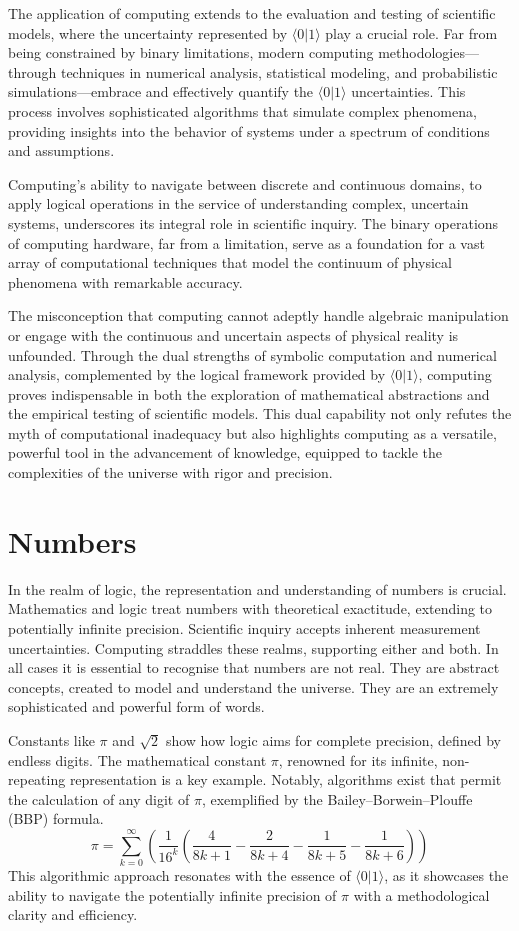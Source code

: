 \documentclass[12pt]{article}
\newcommand{\qbit}{\ensuremath{\langle 0 | 1 \rangle}}
\begin{document}
The application of computing extends to the evaluation and testing of scientific models, where the uncertainty represented by \(\qbit\) play a crucial role. Far from being constrained by binary limitations, modern computing methodologies—through techniques in numerical analysis, statistical modeling, and probabilistic simulations—embrace and effectively quantify the \(\qbit\) uncertainties. This process involves sophisticated algorithms that simulate complex phenomena, providing insights into the behavior of systems under a spectrum of conditions and assumptions.

Computing's ability to navigate between discrete and continuous domains, to apply logical operations in the service of understanding complex, uncertain systems, underscores its integral role in scientific inquiry. The binary operations of computing hardware, far from a limitation, serve as a foundation for a vast array of computational techniques that model the continuum of physical phenomena with remarkable accuracy.

The misconception that computing cannot adeptly handle algebraic manipulation or engage with the continuous and uncertain aspects of physical reality is unfounded. Through the dual strengths of symbolic computation and numerical analysis, complemented by the logical framework provided by \(\qbit\), computing proves indispensable in both the exploration of mathematical abstractions and the empirical testing of scientific models. This dual capability not only refutes the myth of computational inadequacy but also highlights computing as a versatile, powerful tool in the advancement of knowledge, equipped to tackle the complexities of the universe with rigor and precision.

\section*{Numbers}

In the realm of logic, the representation and understanding of numbers is crucial. Mathematics and logic treat numbers with theoretical exactitude, extending to potentially infinite precision. Scientific inquiry accepts inherent measurement uncertainties. Computing straddles these realms, supporting either and both. In all cases it is essential to recognise that numbers are not real. They are abstract concepts, created to model and understand the universe. They are an extremely sophisticated and powerful form of words.

Constants like \(\pi\) and \(\sqrt{2}\) show how logic aims for complete precision, defined by endless digits. The mathematical constant \(\pi\), renowned for its infinite, non-repeating representation is a key example. Notably, algorithms exist that permit the calculation of any digit of \(\pi\), exemplified by the Bailey–Borwein–Plouffe (BBP) formula. 
\[ \pi = \sum_{k=0}^{\infty} \left( \frac{1}{16^k} \left( \frac{4}{8k + 1} - \frac{2}{8k + 4} - \frac{1}{8k + 5} - \frac{1}{8k + 6} \right) \right) \]
This algorithmic approach resonates with the essence of \(\qbit\), as it showcases the ability to navigate the potentially infinite precision of \(\pi\) with a methodological clarity and efficiency.
\end{document}
